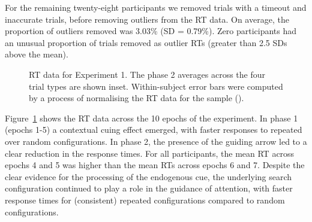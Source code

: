 \documentclass[
  man,
  floatsintext,
  longtable,
  nolmodern,
  notxfonts,
  notimes,
  colorlinks=true,linkcolor=blue,citecolor=blue,urlcolor=blue]{apa7}
\begin{document}
For the remaining twenty-eight participants we removed trials with a
timeout and inaccurate trials, before removing outliers from the RT
data. On average, the proportion of outliers removed was 3.03\% (SD =
0.79\%). Zero participants had an unusual proportion of trials removed
as outlier RTs (greater than 2.5 SDs above the mean).

\begin{figure}[H]


\caption{\label{fig-RT-exp1}RT data for Experiment 1. The phase 2
averages across the four trial types are shown inset. Within-subject
error bars were computed by a process of normalising the RT data for the
sample ().}

\end{figure}%

Figure~\ref{fig-RT-exp1} shows the RT data across the 10 epochs of the
experiment. In phase 1 (epochs 1-5) a contextual cuing effect emerged,
with faster responses to repeated over random configurations. In phase
2, the presence of the guiding arrow led to a clear reduction in the
response times. For all participants, the mean RT across epochs 4 and 5
was higher than the mean RTs across epochs 6 and 7. Despite the clear
evidence for the processing of the endogenous cue, the underlying search
configuration continued to play a role in the guidance of attention,
with faster response times for (consistent) repeated configurations
compared to random configurations.
\end{document}
